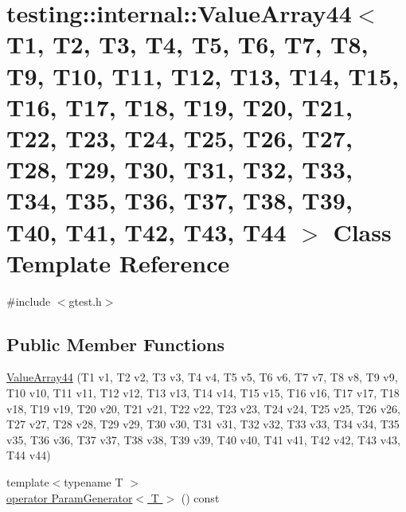 \hypertarget{classtesting_1_1internal_1_1_value_array44}{\section{testing\-:\-:internal\-:\-:Value\-Array44$<$ T1, T2, T3, T4, T5, T6, T7, T8, T9, T10, T11, T12, T13, T14, T15, T16, T17, T18, T19, T20, T21, T22, T23, T24, T25, T26, T27, T28, T29, T30, T31, T32, T33, T34, T35, T36, T37, T38, T39, T40, T41, T42, T43, T44 $>$ Class Template Reference}
\label{classtesting_1_1internal_1_1_value_array44}
}


{\ttfamily \#include $<$gtest.\-h$>$}

\subsection*{Public Member Functions}
\begin{DoxyCompactItemize}
\item 
\hyperlink{classtesting_1_1internal_1_1_value_array44_ab9d24377be591647140614dc44c22521}{Value\-Array44} (T1 v1, T2 v2, T3 v3, T4 v4, T5 v5, T6 v6, T7 v7, T8 v8, T9 v9, T10 v10, T11 v11, T12 v12, T13 v13, T14 v14, T15 v15, T16 v16, T17 v17, T18 v18, T19 v19, T20 v20, T21 v21, T22 v22, T23 v23, T24 v24, T25 v25, T26 v26, T27 v27, T28 v28, T29 v29, T30 v30, T31 v31, T32 v32, T33 v33, T34 v34, T35 v35, T36 v36, T37 v37, T38 v38, T39 v39, T40 v40, T41 v41, T42 v42, T43 v43, T44 v44)
\item 
{\footnotesize template$<$typename T $>$ }\\\hyperlink{classtesting_1_1internal_1_1_value_array44_af1b61d6c661653fa3be82c8c356a2ee2}{operator Param\-Generator$<$ T $>$} () const 
\end{DoxyCompactItemize}


